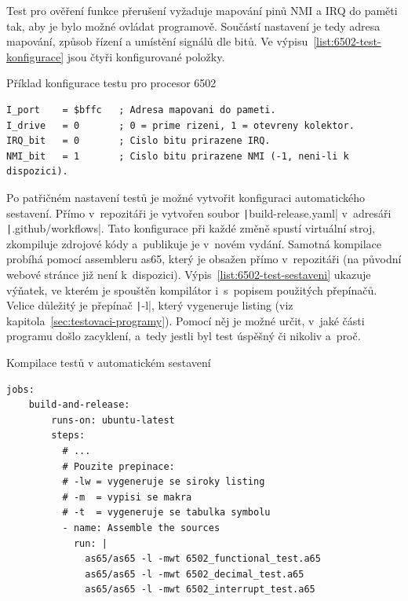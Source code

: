 Test pro ověření funkce přerušení vyžaduje mapování pinů NMI a IRQ do paměti tak, aby je bylo možné ovládat programově. Součástí nastavení je tedy adresa mapování, způsob řízení a umístění signálů dle bitů. Ve výpisu~\ref{list:6502-test-konfigurace} jsou čtyři konfigurované položky.

\begin{listing}[ht!]
	\caption{Příklad konfigurace testu pro procesor 6502}
	\label{list:6502-test-konfigurace}
	\begin{verbatim}
I_port    = $bffc   ; Adresa mapovani do pameti.
I_drive   = 0       ; 0 = prime rizeni, 1 = otevreny kolektor.
IRQ_bit   = 0       ; Cislo bitu prirazene IRQ.
NMI_bit   = 1       ; Cislo bitu prirazene NMI (-1, neni-li k dispozici).
	\end{verbatim}
\end{listing}

Po patřičném nastavení testů je možné vytvořit konfiguraci automatického sestavení. Přímo v~repozitáři je vytvořen soubor \texttt|build-release.yaml| v~adresáři \texttt|.github/workflows|. Tato konfigurace při každé změně spustí virtuální stroj, zkompiluje zdrojové kódy a~publikuje je v~novém vydání. Samotná kompilace probíhá pomocí assembleru as65, který je obsažen přímo v~repozitáři (na původní webové stránce již není k~dispozici). Výpis~\ref{list:6502-test-sestaveni} ukazuje výňatek, ve kterém je spouštěn kompilátor i~s~popisem použitých přepínačů. Velice důležitý je přepínač \texttt|-l|, který vygeneruje listing (viz kapitola~\ref{sec:testovaci-programy}). Pomocí něj je možné určit, v~jaké části programu došlo zacyklení, a~tedy jestli byl test úspěšný či nikoliv a~proč.

\begin{listing}[ht!]
	\caption{Kompilace testů v automatickém sestavení}
	\label{list:6502-test-sestaveni}
	\begin{verbatim}
jobs:
    build-and-release:
        runs-on: ubuntu-latest
        steps:
          # ...
          # Pouzite prepinace:
          # -lw = vygeneruje se siroky listing
          # -m  = vypisi se makra
          # -t  = vygeneruje se tabulka symbolu
          - name: Assemble the sources
            run: |
              as65/as65 -l -mwt 6502_functional_test.a65
              as65/as65 -l -mwt 6502_decimal_test.a65
              as65/as65 -l -mwt 6502_interrupt_test.a65
	\end{verbatim}
\end{listing}

